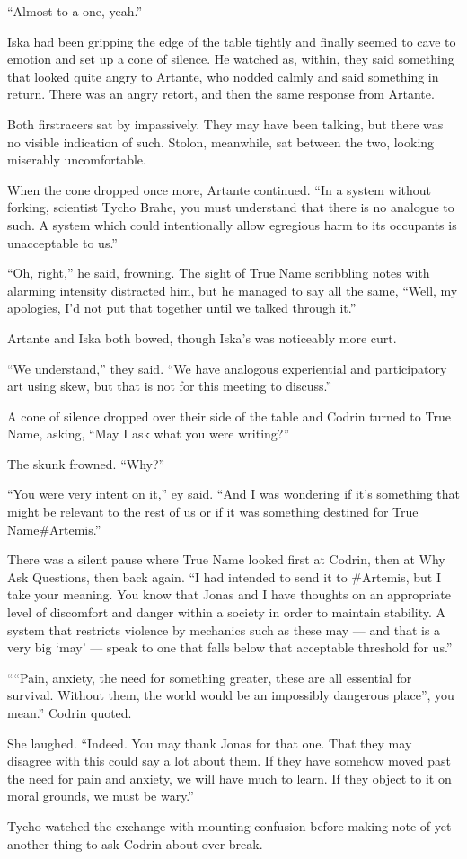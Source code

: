 ``Almost to a one, yeah.''

Iska had been gripping the edge of the table tightly and finally seemed to cave to emotion and set up a cone of silence. He watched as, within, they said something that looked quite angry to Artante, who nodded calmly and said something in return. There was an angry retort, and then the same response from Artante.

Both firstracers sat by impassively. They may have been talking, but there was no visible indication of such. Stolon, meanwhile, sat between the two, looking miserably uncomfortable.

When the cone dropped once more, Artante continued. ``In a system without forking, scientist Tycho Brahe, you must understand that there is no analogue to such. A system which could intentionally allow egregious harm to its occupants is unacceptable to us.''

``Oh, right,'' he said, frowning. The sight of True Name scribbling notes with alarming intensity distracted him, but he managed to say all the same, ``Well, my apologies, I'd not put that together until we talked through it.''

Artante and Iska both bowed, though Iska's was noticeably more curt.

``We understand,'' they said. ``We have analogous experiential and participatory art using skew, but that is not for this meeting to discuss.''

A cone of silence dropped over their side of the table and Codrin turned to True Name, asking, ``May I ask what you were writing?''

The skunk frowned. ``Why?''

``You were very intent on it,'' ey said. ``And I was wondering if it's something that might be relevant to the rest of us or if it was something destined for True Name\#Artemis.''

There was a silent pause where True Name looked first at Codrin, then at Why Ask Questions, then back again. ``I had intended to send it to \#Artemis, but I take your meaning. You know that Jonas and I have thoughts on an appropriate level of discomfort and danger within a society in order to maintain stability. A system that restricts violence by mechanics such as these may — and that is a very big `may' — speak to one that falls below that acceptable threshold for us.''

````Pain, anxiety, the need for something greater, these are all essential for survival. Without them, the world would be an impossibly dangerous place'', you mean.'' Codrin quoted.

She laughed. ``Indeed. You may thank Jonas for that one. That they may disagree with this could say a lot about them. If they have somehow moved past the need for pain and anxiety, we will have much to learn. If they object to it on moral grounds, we must be wary.''

Tycho watched the exchange with mounting confusion before making note of yet another thing to ask Codrin about over break.
